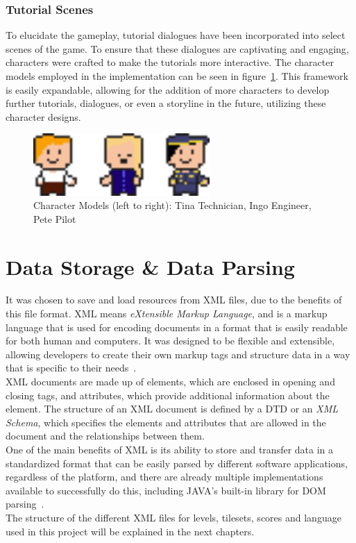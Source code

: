 \subsubsection{Tutorial Scenes}\label{subsubsec:tutorial-scenes}
To elucidate the gameplay, tutorial dialogues have been incorporated into select scenes of the game.
To ensure that these dialogues are captivating and engaging, characters were crafted to make the tutorials more interactive.
The character models employed in the implementation can be seen in figure~\ref{fig:character-models}.
This framework is easily expandable, allowing for the addition of more characters to develop further tutorials,
dialogues, or even a storyline in the future, utilizing these character designs.
\begin{figure}
    \centering
    \includegraphics[width=0.6\textwidth]{Pictures/res/implementation/character-models}
    \caption{Character Models (left to right): Tina Technician, Ingo Engineer, Pete Pilot}
    \label{fig:character-models}
\end{figure}

\section{Data Storage \& Data Parsing}\label{sec:data-storage-&-data-parsing}
It was chosen to save and load resources from XML files, due to the benefits of this file format.
XML means \textit{eXtensible Markup Language}, and is a markup language that is used for encoding documents in a format that is easily readable for both human and computers.
It was designed to be flexible and extensible, allowing developers to create their own markup tags and structure data in a way that is specific to their needs~\cite{xml}.
\\
XML documents are made up of elements, which are enclosed in opening and closing tags, and attributes, which provide additional information about the element.
The structure of an XML document is defined by a \gls{DTD} or an \textit{XML Schema}, which specifies the elements and attributes that are allowed in the document and the relationships between them.
\\
One of the main benefits of XML is its ability to store and transfer data in a standardized format that can be easily parsed by different software applications, regardless of the platform, and there are
already multiple implementations available to successfully do this, including JAVA's built-in library for \gls{DOM} parsing~\cite{dom-parser}.
\\
The structure of the different XML files for levels, tilesets, scores and language used in this project will be explained in the next chapters.
